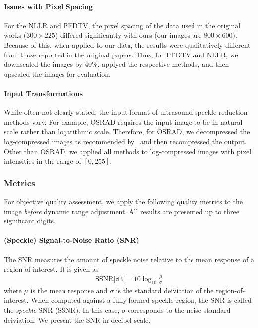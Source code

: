 \paragraph{Issues with Pixel Spacing}
For the NLLR and PFDTV, the pixel spacing of the data used in the original works (\(300 \times 225\)) differed significantly with ours (our images are \(800 \times 600\)).
Because of this, when applied to our data, the results were qualitatively different from those reported in the original papers.
Thus, for PFDTV and NLLR, we downscaled the images by \(40\%\), applyed the respective methods, and then upscaled the images for evaluation.

\paragraph{Input Transformations}
While often not clearly stated, the input format of ultrasound speckle reduction methods vary.
For example, OSRAD requires the input image to be in natural scale rather than logarithmic scale.
Therefore, for OSRAD, we decompressed the log-compressed images as recommended by~\cite{yongjianyu_generalized_2004} and then recompressed the output.
Other than OSRAD, we applied all methods to log-compressed images with pixel intensities in the range of \([0, 255]\).

\subsubsection{Metrics}
For objective quality assessment, we apply the following quality metrics to the image \textit{before} dynamic range adjustment.
All results are presented up to three significant digits.

\paragraph{(Speckle) Signal-to-Noise Ratio (SNR)}
The SNR measures the amount of speckle noise relative to the mean response of a region-of-interest.
It is given as
\begin{align}
  \mathrm{SSNR} \texttt{[dB]} = 10 \log_{10} \frac{\mu}{\sigma}
\end{align}
where \(\mu\) is the mean response and \(\sigma\) is the standard deiviation of the region-of-interest.
When computed against a fully-formed speckle region, the SNR is called the \textit{speckle} SNR (SSNR).
In this case, \(\sigma\) corresponds to the noise standard deiviation.
We present the SNR in decibel scale.

